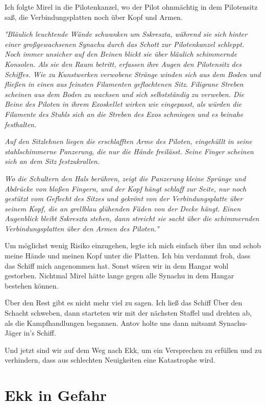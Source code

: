 \documentclass[11pt]{scrartcl}
\begin{document}
Ich folgte Mirel in die Pilotenkanzel, wo der Pilot ohnmächtig in dem
Pilotensitz saß, die Verbindungsplatten noch über Kopf und Armen.

\emph{°Bläulich leuchtende Wände schwanken um Sskreszta, während sie
sich hinter einer großgewachsenen Synachu durch das Schott zur
Pilotenkanzel schleppt. Noch immer unsicher auf den Beinen blickt sie
über bläulich schimmernde Konsolen. Als sie den Raum betritt, erfassen
ihre Augen den Pilotensitz des Schiffes. Wie zu Kunstwerken verwobene
Stränge winden sich aus dem Boden und fließen in einen aus feinsten
Filamenten geflochtenen Sitz. Filigrane Streben scheinen aus dem Boden
zu wachsen und sich selbstständig zu verweben. Die Beine des Piloten in
ihrem Exoskellet wirken wie eingepasst, als würden die Filamente des
Stuhls sich an die Streben des Exos schmiegen und es beinahe
festhalten.}

\emph{Auf den Sitzlehnen liegen die erschlafften Arme des Piloten,
eingehüllt in seine stahlschimmerne Panzerung, die nur die Hände
freilässt. Seine Finger scheinen sich an dem Sitz festzukrallen.}

\emph{Wo die Schultern den Hals berühren, zeigt die Panzerung kleine
Sprünge und Abdrücke von bloßen Fingern, und der Kopf hängt schlaff zur
Seite, nur noch gestützt vom Geflecht des Sitzes und gekrönt von der
Verbindungsplatte über seinem Kopf, die an grellblau glühenden Fäden von
der Decke hängt. Einen Augenblick bleibt Sskreszta stehen, dann streicht
sie sacht über die schimmernden Verbindungsplatten über den Armen des
Piloten.°}

Um möglichst wenig Risiko einzugehen, legte ich mich einfach über ihn
und schob meine Hände und meinen Kopf unter die Platten. Ich bin
verdammt froh, dass das Schiff mich angenommen hat. Sonst wären wir in
dem Hangar wohl gestorben. Nichtmal Mirel hätte lange gegen alle Synachu
in dem Hangar bestehen können.

Über den Rest gibt es nicht mehr viel zu sagen. Ich ließ das Schiff Über
den Schacht schweben, dann starteten wir mit der nächsten Staffel und
drehten ab, als die Kampfhandlungen begannen. Antov holte uns dann
mitsamt Synachu-Jäger in's Schiff.

Und jetzt sind wir auf dem Weg nach Ekk, um ein Versprechen zu erfüllen
und zu verhindern, dass aus schlechten Neuigkeiten eine Katastrophe
wird.

\section{Ekk in Gefahr}
\end{document}
